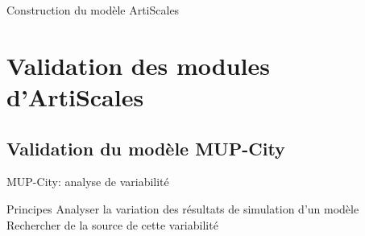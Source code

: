 \documentclass[xcolor=table]{beamer}
\begin{document}
\begin{frame}{Construction du modèle ArtiScales}
\end{frame}

\section[Validation]{Validation des modules d'ArtiScales}

\subsection{Validation du modèle MUP-City}

\begin{frame}
\subsectionpage
\end{frame}

\begin{frame}{MUP-City: analyse de variabilité}
	\begin{block}{Principes}
				Analyser la variation des résultats de simulation d'un modèle\\
				Rechercher de la source de cette variabilité
		\end{block}

\end{frame}
\end{document}
